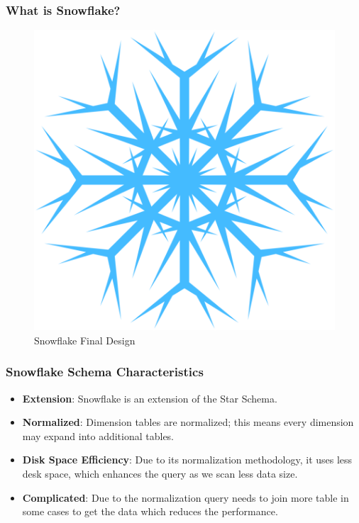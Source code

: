 \begin{frame}
	\frametitle{What is Snowflake?}
	\begin{figure}
		\includegraphics[scale=0.2]{Ch01-Introduction-data-management/12-Data-Model/04-Data-Model-Schema-Types/Figures/Frozen-Snowflake-PNG-File.png}
		\caption{Snowflake Final Design}
	\end{figure}
\end{frame}
\begin{frame}
\frametitle{Snowflake Schema Characteristics}
	\begin{itemize}[<+->]
		\item \textbf{Extension}: Snowflake is an extension of the Star Schema.
		\item \textbf{Normalized}: Dimension tables are normalized; this means every dimension may expand into additional tables.
		\item \textbf{Disk Space Efficiency}:  Due to its normalization methodology, it uses less desk space, which enhances the query as we scan less data size.
		\item \textbf{Complicated}: Due to the normalization query needs to join more table in some cases to get the data which reduces the performance.
	\end{itemize}

\end{frame}

